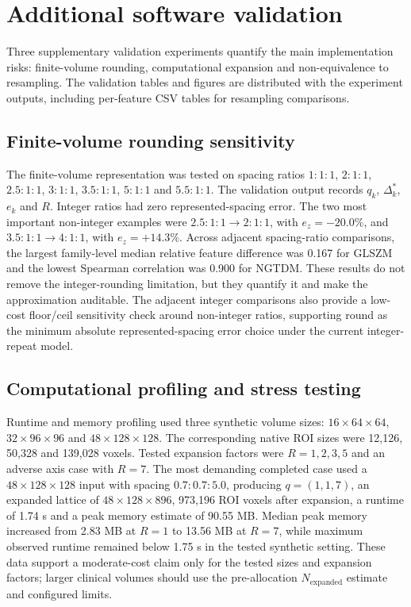 \documentclass[11pt]{article}
\begin{document}
\section{Additional software validation}
Three supplementary validation experiments quantify the main implementation risks: finite-volume rounding, computational expansion and non-equivalence to resampling. The validation tables and figures are distributed with the experiment outputs, including per-feature CSV tables for resampling comparisons.



\subsection{Finite-volume rounding sensitivity}
The finite-volume representation was tested on spacing ratios \(1{:}1{:}1\), \(2{:}1{:}1\), \(2.5{:}1{:}1\), \(3{:}1{:}1\), \(3.5{:}1{:}1\), \(5{:}1{:}1\) and \(5.5{:}1{:}1\). The validation output records \(q_k\), \(\Delta_k^{*}\), \(e_k\) and \(R\). Integer ratios had zero represented-spacing error. The two most important non-integer examples were \(2.5{:}1{:}1\rightarrow2{:}1{:}1\), with \(e_z=-20.0\%\), and \(3.5{:}1{:}1\rightarrow4{:}1{:}1\), with \(e_z=+14.3\%\). Across adjacent spacing-ratio comparisons, the largest family-level median relative feature difference was 0.167 for GLSZM and the lowest Spearman correlation was 0.900 for NGTDM. These results do not remove the integer-rounding limitation, but they quantify it and make the approximation auditable. The adjacent integer comparisons also provide a low-cost floor/ceil sensitivity check around non-integer ratios, supporting round as the minimum absolute represented-spacing error choice under the current integer-repeat model.

\subsection{Computational profiling and stress testing}
Runtime and memory profiling used three synthetic volume sizes: \(16\times64\times64\), \(32\times96\times96\) and \(48\times128\times128\). The corresponding native ROI sizes were 12,126, 50,328 and 139,028 voxels. Tested expansion factors were \(R=1,2,3,5\) and an adverse axis case with \(R=7\). The most demanding completed case used a \(48\times128\times128\) input with spacing \(0.7{:}0.7{:}5.0\), producing \(q=(1,1,7)\), an expanded lattice of \(48\times128\times896\), 973,196 ROI voxels after expansion, a runtime of 1.74 s and a peak memory estimate of 90.55 MB. Median peak memory increased from 2.83 MB at \(R=1\) to 13.56 MB at \(R=7\), while maximum observed runtime remained below 1.75 s in the tested synthetic setting. These data support a moderate-cost claim only for the tested sizes and expansion factors; larger clinical volumes should use the pre-allocation \(N_{\mathrm{expanded}}\) estimate and configured limits.
\end{document}
